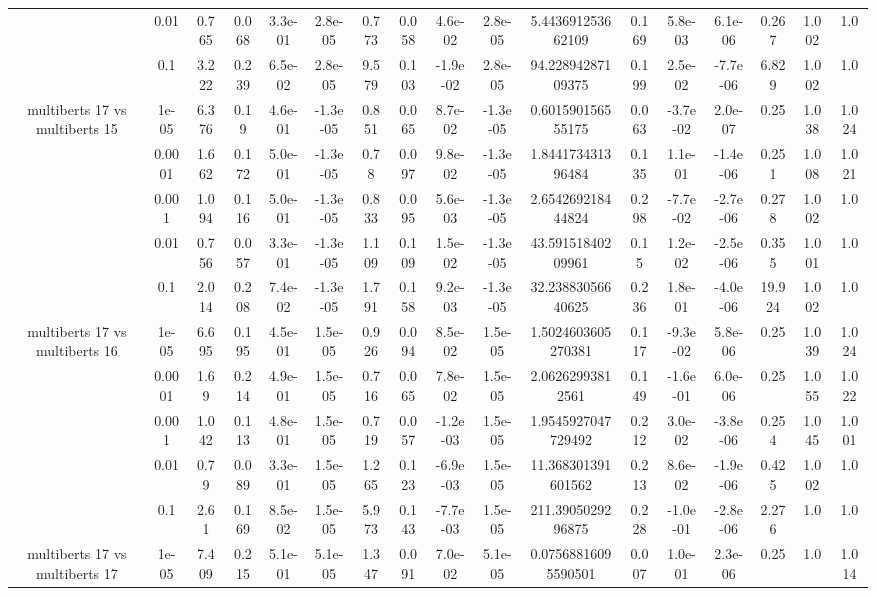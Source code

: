 \begin{tabular}{|c|c|c|c|c|c|c|c|c|c|c|c|c|c|c|c|c|}
 & 0.01 & 0.765 & 0.068 & 3.3e-01 & 2.8e-05 & 0.773 & 0.058 & 4.6e-02 & 2.8e-05 & 5.443691253662109 & 0.169 & 5.8e-03 & 6.1e-06 & 0.267 & 1.002 & 1.0 \\
 & 0.1 & 3.222 & 0.239 & 6.5e-02 & 2.8e-05 & 9.579 & 0.103 & -1.9e-02 & 2.8e-05 & 94.22894287109375 & 0.199 & 2.5e-02 & -7.7e-06 & 6.829 & 1.002 & 1.0 \\
\hline
\multirow{5}{*}{multiberts 17 vs multiberts 15} & 1e-05 & 6.376 & 0.19 & 4.6e-01 & -1.3e-05 & 0.851 & 0.065 & 8.7e-02 & -1.3e-05 & 0.601590156555175 & 0.063 & -3.7e-02 & 2.0e-07 & 0.25 & 1.038 & 1.024 \\
 & 0.0001 & 1.662 & 0.172 & 5.0e-01 & -1.3e-05 & 0.78 & 0.097 & 9.8e-02 & -1.3e-05 & 1.844173431396484 & 0.135 & 1.1e-01 & -1.4e-06 & 0.251 & 1.008 & 1.021 \\
 & 0.001 & 1.094 & 0.116 & 5.0e-01 & -1.3e-05 & 0.833 & 0.095 & 5.6e-03 & -1.3e-05 & 2.654269218444824 & 0.298 & -7.7e-02 & -2.7e-06 & 0.278 & 1.002 & 1.0 \\
 & 0.01 & 0.756 & 0.057 & 3.3e-01 & -1.3e-05 & 1.109 & 0.109 & 1.5e-02 & -1.3e-05 & 43.59151840209961 & 0.15 & 1.2e-02 & -2.5e-06 & 0.355 & 1.001 & 1.0 \\
 & 0.1 & 2.014 & 0.208 & 7.4e-02 & -1.3e-05 & 1.791 & 0.158 & 9.2e-03 & -1.3e-05 & 32.23883056640625 & 0.236 & 1.8e-01 & -4.0e-06 & 19.924 & 1.002 & 1.0 \\
\hline
\multirow{5}{*}{multiberts 17 vs multiberts 16} & 1e-05 & 6.695 & 0.195 & 4.5e-01 & 1.5e-05 & 0.926 & 0.094 & 8.5e-02 & 1.5e-05 & 1.5024603605270381 & 0.117 & -9.3e-02 & 5.8e-06 & 0.25 & 1.039 & 1.024 \\
 & 0.0001 & 1.69 & 0.214 & 4.9e-01 & 1.5e-05 & 0.716 & 0.065 & 7.8e-02 & 1.5e-05 & 2.06262993812561 & 0.149 & -1.6e-01 & 6.0e-06 & 0.25 & 1.055 & 1.022 \\
 & 0.001 & 1.042 & 0.113 & 4.8e-01 & 1.5e-05 & 0.719 & 0.057 & -1.2e-03 & 1.5e-05 & 1.9545927047729492 & 0.212 & 3.0e-02 & -3.8e-06 & 0.254 & 1.045 & 1.001 \\
 & 0.01 & 0.79 & 0.089 & 3.3e-01 & 1.5e-05 & 1.265 & 0.123 & -6.9e-03 & 1.5e-05 & 11.368301391601562 & 0.213 & 8.6e-02 & -1.9e-06 & 0.425 & 1.002 & 1.0 \\
 & 0.1 & 2.61 & 0.169 & 8.5e-02 & 1.5e-05 & 5.973 & 0.143 & -7.7e-03 & 1.5e-05 & 211.3905029296875 & 0.228 & -1.0e-01 & -2.8e-06 & 2.276 & 1.0 & 1.0 \\
\hline
\multirow{5}{*}{multiberts 17 vs multiberts 17} & 1e-05 & 7.409 & 0.215 & 5.1e-01 & 5.1e-05 & 1.347 & 0.091 & 7.0e-02 & 5.1e-05 & 0.07568816095590501 & 0.007 & 1.0e-01 & 2.3e-06 & 0.25 & 1.0 & 1.014 \\

\end{tabular}
